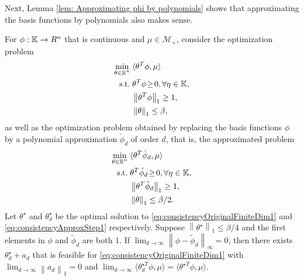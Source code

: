Next, Lemma \ref{lem: Approximating phi by polynomials} shows that approximating the basis functions by polynomials also makes sense.

\begin{lemma}\label{lem: Approximating phi by polynomials}
    For $\phi:\mathbb{K}\rightarrow R^n$ that is continuous and $\mu\in\mathcal{M}_+$, consider the optimization problem
    \begin{subequations}\label{eq:consistencyOriginalFiniteDim1}
    \begin{align}
    \min_{\substack{\theta\in\mathbb{R}^n}} 
    &\;\langle\theta^T\phi,\mu \rangle\\
    \operatorname*{s.\hspace{-2pt}t.} &\;\theta^T\phi\!\ge\! 0,\forall \eta\in\mathbb{K},\\
    &\;\left\|\theta^T\phi\right\|_1 \geq 1,\\
    &\;\left\|\theta\right\|_1\leq \beta,
    \end{align}
    \end{subequations}
    as well as the optimization problem obtained by replacing the basis functions $\phi$ by a polynomial approximation $\tilde{{\phi}}_d$ of order $d$, that is, the approximated problem
    \begin{subequations}\label{eq:consistencyApproxStep1}
    \begin{align}
    \min_{\substack{\theta\in\mathbb{R}^n}} 
    &\;\langle\theta^T\tilde{{\phi}}_d,\mu \rangle\\
    \operatorname*{s.\hspace{-2pt}t.} &\;\theta^T\tilde{{\phi}}_d\!\ge\! 0,\forall \eta\in\mathbb{K},\label{eq:nonnegative_cstr}\\
    &\;\left\|\theta^T\tilde{{\phi}}_d\right\|_1 \geq 1,\label{eq:1-norm_regularity_cstr}\\
    &\;\left\|\theta\right\|_1\leq \beta/2.\label{eq:theta_norm_cstr}
    \end{align}
    \end{subequations}
    Let $\theta^\star$ and $\theta_{d}^\star $ be the optimal solution to \eqref{eq:consistencyOriginalFiniteDim1} and \eqref{eq:consistencyApproxStep1} respectively. Suppose $\left\|\theta^\star\right\|_1 \leq \beta/4$ and the first elements in $\phi$ and $\tilde{\phi}_d$ are both $1$. 
    If $\lim_{d\rightarrow\infty}\left\|\phi - \tilde{\phi}_d\right\|_\infty = 0$, then there exists $\theta_{d}^\star +a_d$ that is feasible for \eqref{eq:consistencyOriginalFiniteDim1} with $\lim_{d\rightarrow\infty}\left\|a_d\right\|_1 = 0$ and $\lim_{d\rightarrow\infty}\langle\theta_{d}^{\star T}\phi,\mu \rangle = \langle\theta^{\star T}{\phi} ,\mu \rangle$.
\end{lemma}

